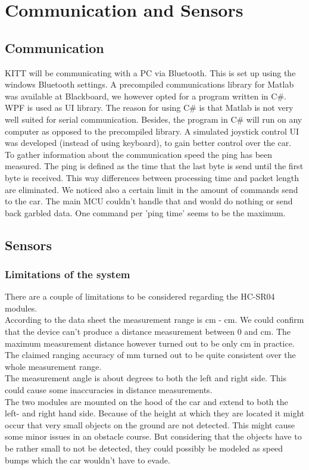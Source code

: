 \documentclass[final]{scrreprt} %
\begin{document}
\chapter{Communication and Sensors}
\section{Communication}
KITT will be communicating with a PC via Bluetooth. 
This is set up using the windows Bluetooth settings.
A precompiled communications library for Matlab was available at Blackboard, we however opted for a program written in C\#.
WPF is used as UI library.
The reason for using C\# is that Matlab is not very well suited for serial communication.
Besides, the program in C\# will run on any computer as opposed to the precompiled library. 
A simulated joystick control UI was developed (instead of using keyboard), to gain better control over the car.
\\
To gather information about the communication speed the ping has been measured. 
The ping is defined as the time that the last byte is send until the first byte is received.
This way differences between processing time and packet length are eliminated.
We noticed also a certain limit in the amount of commands send to the car.
The main MCU couldn't handle that and would do nothing or send back garbled data.
One command per 'ping time' seems to be the maximum.

\section{Sensors}
\subsection{Limitations of the system}

There are a couple of limitations to be considered regarding the HC-SR04 modules.\\
According to the data sheet the measurement range is \unit[2]{cm} - \unit[400]{cm}. 
We could confirm that the device can't produce a distance measurement between 0 and \unit[2]{cm}. 
The maximum measurement distance however turned out to be only \unit[300]{cm} in practice.\\ 
The claimed ranging accuracy of \unit[3]{mm} turned out to be quite consistent over the whole measurement range.\\
The measurement angle is about \unit[15]{degrees} to both the left and right side. 
This could cause some inaccuracies in distance measurements.\\
The two modules are mounted on the hood of the car and extend to both the left- and right hand side. 
Because of the height at which they are located it might occur that very small objects on the ground are not detected. 
This might cause some minor issues in an obstacle course. 
But considering that the objects have to be rather small to not be detected, they could possibly be modeled as speed bumps which the car wouldn't have to evade.
\end{document}
